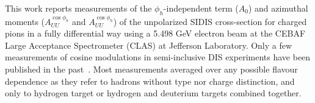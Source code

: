 \documentclass[aps,prl,twocolumn,showpacs,superscriptaddress,groupedaddress]{revtex4-1}  %
\begin{document}
This work reports measurements of the $\phi_h$-independent term ($A_0$) and azimuthal moments ($A^{\cos \phi_h}_{UU}$ and $A^{\cos \phi_h}_{UU}$) of the unpolarized SIDIS cross-section for charged pions in a fully differential way using a 5.498 GeV electron beam at the CEBAF Large Acceptance Spectrometer (CLAS) \cite{Mecking:2003zu} at Jefferson Laboratory.
Only a few measurements of cosine modulations in semi-inclusive DIS experiments have been published in the past~\cite{Aubert:1983cz,Arneodo:1986cf,Adams:1993hs,Breitweg:2000qh}.
Most measurements averaged over any possible flavour dependence as they refer to hadrons without type nor charge distinction, and only to hydrogen target or hydrogen and deuterium targets combined together.

\end{document}
